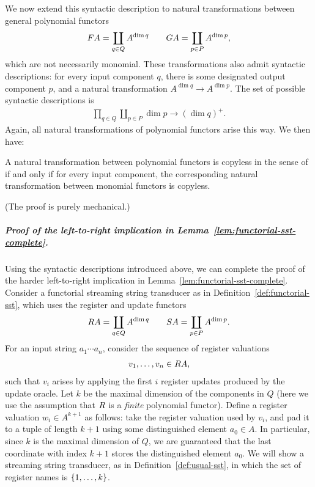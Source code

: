 We now extend this syntactic description to natural transformations between general polynomial functors 
\begin{align*}
\functor A = \coprod_{q \in Q} A^{\dim q} \qquad 
\functorg A = \coprod_{p \in P} A^{\dim p},
\end{align*}
which are not necessarily monomial. These transformations also admit syntactic descriptions: for every input component $q$, there is some designated output component $p$, and a natural transformation $A^{\dim q} \to A^{\dim p}$.  The set of possible syntactic descriptions is
\begin{align*}
\prod_{q \in Q} \coprod_{p \in P} \dim p \to (\dim q)^+.
\end{align*}
Again, all natural transformations of polynomial functors arise this way.
We then have:
\begin{claim}
  A natural transformation between polynomial functors is copyless in the sense of  if and only if for every input component, the corresponding natural transformation between monomial functors is copyless.
\end{claim}

(The proof is purely mechanical.)

\subparagraph*{Proof of the left-to-right implication in Lemma~\ref{lem:functorial-sst-complete}.} Using the syntactic descriptions introduced above, we can complete the proof of the harder left-to-right implication in Lemma~\ref{lem:functorial-sst-complete}. Consider a functorial streaming string transducer as in Definition~\ref{def:functorial-sst}, which uses the register and update functors 
\begin{align*} 
\functorr A = \coprod_{q \in Q} A^{\dim q} \qquad 
\functors A = \coprod_{p \in P} A^{\dim p}.
\end{align*}
For an input string $a_1 \cdots a_n$, consider the sequence of register valuations 
\begin{align*}
v_1,\ldots,v_n \in \functorr A,
\end{align*}
such that $v_i$ arises by applying the first $i$ register updates produced by the update oracle. Let $k$ be the maximal dimension of the components in $Q$ (here we use the assumption that $\functorr$ is a \emph{finite} polynomial functor). Define a register valuation $w_i \in A^{k+1}$ as follows: take the register valuation used by $v_i$, and pad it to a tuple of length  $k+1$ using some distinguished element $a_0 \in A$. In particular, since $k$ is the maximal dimension of $Q$, we are guaranteed that the last coordinate with index $k+1$ stores the distinguished element $a_0$. We will show a streaming string transducer, as in Definition~\ref{def:usual-sst}, in which the set of register names is $\{1,\ldots,k\}$. 

